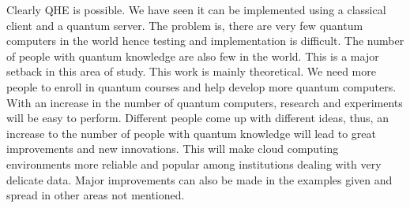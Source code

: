 Clearly QHE is possible. We have seen it can be implemented using a classical client and a quantum server. The problem is, there are very few quantum computers in the world hence testing and implementation is difficult. The number of people with quantum knowledge are also few in the world. This is a major setback in this area of study. This work is mainly theoretical. We need more people to enroll in quantum courses and help develop more quantum computers. With an increase in the number of quantum computers, research and experiments will be easy to perform. Different people come up with different ideas, thus, an increase to the number of people with quantum knowledge will lead to great improvements and new innovations. This will make cloud computing environments more reliable and popular among institutions dealing with very delicate data. Major improvements can also be made in the examples given and spread in other areas not mentioned. 









